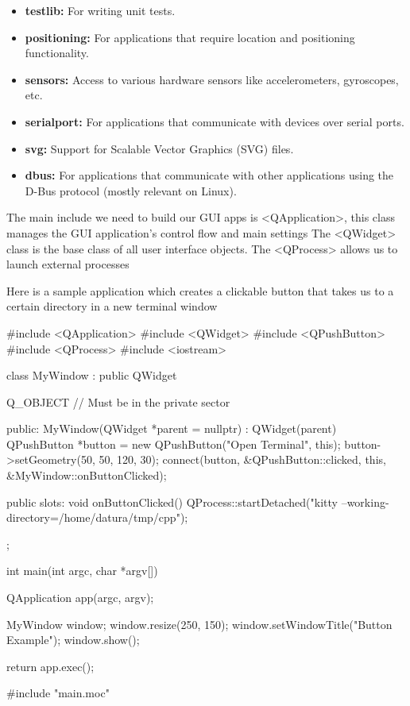 \documentclass{report}
\begin{document}
\begin{itemize}
\begin{itemize}
                \item \textbf{testlib:} For writing unit tests.
                \item \textbf{positioning:} For applications that require location and positioning functionality.
                \item \textbf{sensors:} Access to various hardware sensors like accelerometers, gyroscopes, etc.
                \item \textbf{serialport:} For applications that communicate with devices over serial ports.
                \item \textbf{svg:} Support for Scalable Vector Graphics (SVG) files.
                \item \textbf{dbus:} For applications that communicate with other applications using the D-Bus protocol (mostly relevant on Linux). 
            \end{itemize}
    \end{itemize}

    \pagebreak
    \bigbreak \noindent 
    The main include we need to build our GUI apps is <QApplication>, this class manages the GUI application's control flow and main settings
    \bigbreak \noindent 
    The <QWidget> class is the base class of all user interface objects. 
    \bigbreak \noindent 
    The <QProcess> allows us to launch external processes

    \pagebreak 
    \bigbreak \noindent 
    Here is a sample application which creates a clickable button that takes us to a certain directory in a new terminal window
    \bigbreak \noindent 
    \begin{cppcode}
#include <QApplication>
#include <QWidget>
#include <QPushButton>
#include <QProcess>
#include <iostream>

class MyWindow : public QWidget {
    Q_OBJECT // Must be in the private sector

public:
    MyWindow(QWidget *parent = nullptr) : QWidget(parent) {
        QPushButton *button = new QPushButton("Open Terminal", this);
        button->setGeometry(50, 50, 120, 30);
        connect(button, &QPushButton::clicked, this, &MyWindow::onButtonClicked);
    }

public slots:
    void onButtonClicked() {
        QProcess::startDetached("kitty --working-directory=/home/datura/tmp/cpp");
    }
};

int main(int argc, char *argv[]) {
    QApplication app(argc, argv);

    MyWindow window;
    window.resize(250, 150);
    window.setWindowTitle("Button Example");
    window.show();

    return app.exec();
}

#include "main.moc"
    \end{cppcode}
\end{document}
